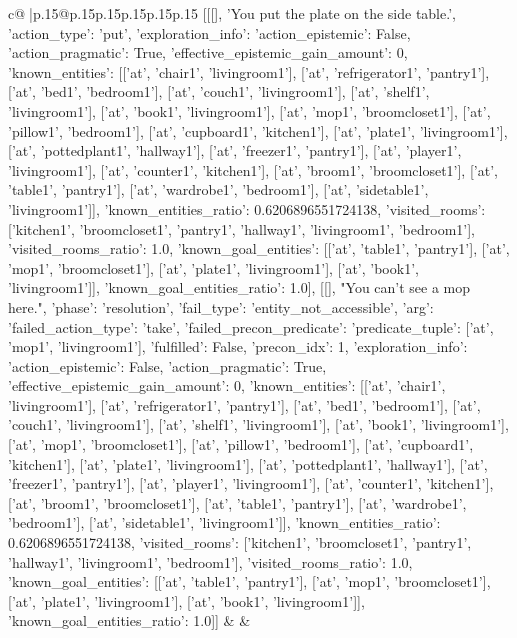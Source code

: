 \documentclass{article}
\begin{document}
{\begin{supertabular}{c@{$\;$}|p{.15\linewidth}@{}p{.15\linewidth}p{.15\linewidth}p{.15\linewidth}p{.15\linewidth}p{.15\linewidth}}
{{{	 [[[], 'You put the plate on the side table.', {'action_type': 'put', 'exploration_info': {'action_epistemic': False, 'action_pragmatic': True, 'effective_epistemic_gain_amount': 0, 'known_entities': [['at', 'chair1', 'livingroom1'], ['at', 'refrigerator1', 'pantry1'], ['at', 'bed1', 'bedroom1'], ['at', 'couch1', 'livingroom1'], ['at', 'shelf1', 'livingroom1'], ['at', 'book1', 'livingroom1'], ['at', 'mop1', 'broomcloset1'], ['at', 'pillow1', 'bedroom1'], ['at', 'cupboard1', 'kitchen1'], ['at', 'plate1', 'livingroom1'], ['at', 'pottedplant1', 'hallway1'], ['at', 'freezer1', 'pantry1'], ['at', 'player1', 'livingroom1'], ['at', 'counter1', 'kitchen1'], ['at', 'broom1', 'broomcloset1'], ['at', 'table1', 'pantry1'], ['at', 'wardrobe1', 'bedroom1'], ['at', 'sidetable1', 'livingroom1']], 'known_entities_ratio': 0.6206896551724138, 'visited_rooms': ['kitchen1', 'broomcloset1', 'pantry1', 'hallway1', 'livingroom1', 'bedroom1'], 'visited_rooms_ratio': 1.0, 'known_goal_entities': [['at', 'table1', 'pantry1'], ['at', 'mop1', 'broomcloset1'], ['at', 'plate1', 'livingroom1'], ['at', 'book1', 'livingroom1']], 'known_goal_entities_ratio': 1.0}}], [[], "You can't see a mop here.", {'phase': 'resolution', 'fail_type': 'entity_not_accessible', 'arg': {'failed_action_type': 'take', 'failed_precon_predicate': {'predicate_tuple': ['at', 'mop1', 'livingroom1'], 'fulfilled': False, 'precon_idx': 1}}, 'exploration_info': {'action_epistemic': False, 'action_pragmatic': True, 'effective_epistemic_gain_amount': 0, 'known_entities': [['at', 'chair1', 'livingroom1'], ['at', 'refrigerator1', 'pantry1'], ['at', 'bed1', 'bedroom1'], ['at', 'couch1', 'livingroom1'], ['at', 'shelf1', 'livingroom1'], ['at', 'book1', 'livingroom1'], ['at', 'mop1', 'broomcloset1'], ['at', 'pillow1', 'bedroom1'], ['at', 'cupboard1', 'kitchen1'], ['at', 'plate1', 'livingroom1'], ['at', 'pottedplant1', 'hallway1'], ['at', 'freezer1', 'pantry1'], ['at', 'player1', 'livingroom1'], ['at', 'counter1', 'kitchen1'], ['at', 'broom1', 'broomcloset1'], ['at', 'table1', 'pantry1'], ['at', 'wardrobe1', 'bedroom1'], ['at', 'sidetable1', 'livingroom1']], 'known_entities_ratio': 0.6206896551724138, 'visited_rooms': ['kitchen1', 'broomcloset1', 'pantry1', 'hallway1', 'livingroom1', 'bedroom1'], 'visited_rooms_ratio': 1.0, 'known_goal_entities': [['at', 'table1', 'pantry1'], ['at', 'mop1', 'broomcloset1'], ['at', 'plate1', 'livingroom1'], ['at', 'book1', 'livingroom1']], 'known_goal_entities_ratio': 1.0}}]] 
	  } 
	   } 
	   } 
	 & & \\ 
 

    \theutterance {}  


\end{supertabular}}
\end{document}
